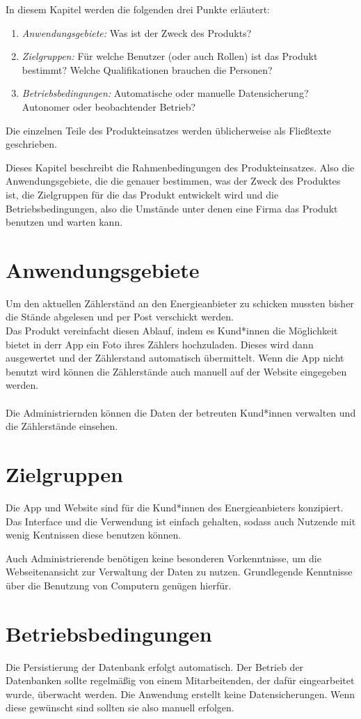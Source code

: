 \begin{tcolorbox}
In diesem Kapitel werden die folgenden drei Punkte erläutert:
\begin{enumerate}
	\item \textit{Anwendungsgebiete:} Was ist der Zweck des Produkts?
	\item \textit{Zielgruppen:} Für welche Benutzer (oder auch Rollen) ist das Produkt bestimmt?
	Welche Qualifikationen brauchen die Personen?
	\item \textit{Betriebsbedingungen:} Automatische oder manuelle Datensicherung? 	Autonomer oder beobachtender Betrieb? 	
\end{enumerate}

\noindent Die einzelnen Teile des Produkteinsatzes werden üblicherweise als Fließtexte geschrieben.
\end{tcolorbox}
Dieses Kapitel beschreibt die Rahmenbedingungen des Produkteinsatzes. Also die Anwendungsgebiete, die die genauer bestimmen, was der Zweck des Produktes ist, die Zielgruppen für die das Produkt entwickelt wird
und die Betriebsbedingungen, also die Umstände unter denen eine Firma das Produkt benutzen und warten kann.

\section{Anwendungsgebiete}
	Um den aktuellen Zählerständ an den Energieanbieter zu schicken mussten bisher die Stände abgelesen und per Post verschickt 		  
	werden. \\
	Das Produkt vereinfacht diesen Ablauf, indem es Kund*innen die Möglichkeit bietet in derr App ein Foto ihres Zählers hochzuladen. Dieses wird dann 	
	ausgewertet und der Zählerstand  automatisch übermittelt.
	Wenn die App nicht benutzt wird können die Zählerstände auch manuell auf der Website eingegeben werden.\\\\
	Die Administriernden können die Daten der betreuten Kund*innen verwalten und die Zählerstände einsehen.
\section{Zielgruppen}
	Die App und Website sind für die Kund*innen des Energieanbieters konzipiert. Das Interface und die Verwendung ist einfach gehalten, sodass auch Nutzende mit wenig
	Kentnissen diese benutzen können.
	
	Auch Administrierende benötigen keine besonderen Vorkenntnisse, um die Webseitenansicht zur Verwaltung der Daten zu nutzen.
	Grundlegende Kenntnisse über die Benutzung von Computern genügen hierfür.
	
\section{Betriebsbedingungen}
	Die Persistierung der Datenbank erfolgt automatisch. Der Betrieb der Datenbanken sollte regelmäßig von einem Mitarbeitenden, der dafür eingearbeitet wurde,  überwacht werden.
	Die Anwendung erstellt keine Datensicherungen. Wenn diese gewünscht sind sollten sie also manuell erfolgen.
	
